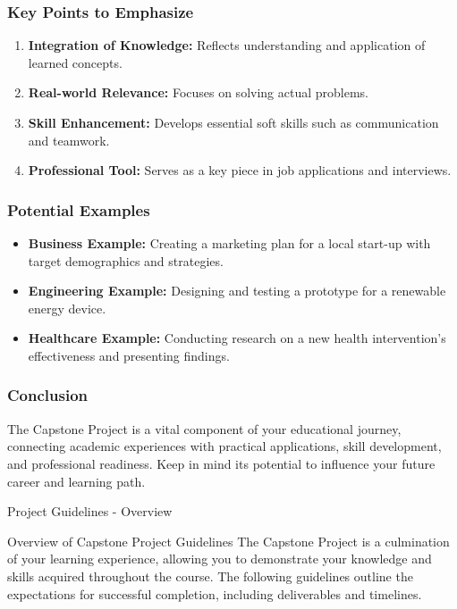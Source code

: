 \documentclass[aspectratio=169]{beamer}
\begin{document}
\begin{frame}[fragile]
    \frametitle{Key Points to Emphasize}
    \begin{enumerate}
        \item \textbf{Integration of Knowledge:} Reflects understanding and application of learned concepts.
        \item \textbf{Real-world Relevance:} Focuses on solving actual problems.
        \item \textbf{Skill Enhancement:} Develops essential soft skills such as communication and teamwork.
        \item \textbf{Professional Tool:} Serves as a key piece in job applications and interviews.
    \end{enumerate}
\end{frame}

\begin{frame}[fragile]
    \frametitle{Potential Examples}
    \begin{itemize}
        \item \textbf{Business Example:} Creating a marketing plan for a local start-up with target demographics and strategies.
        \item \textbf{Engineering Example:} Designing and testing a prototype for a renewable energy device.
        \item \textbf{Healthcare Example:} Conducting research on a new health intervention's effectiveness and presenting findings.
    \end{itemize}
\end{frame}

\begin{frame}[fragile]
    \frametitle{Conclusion}
    The Capstone Project is a vital component of your educational journey, connecting academic experiences with practical applications, skill development, and professional readiness. Keep in mind its potential to influence your future career and learning path.
\end{frame}

\begin{frame}[fragile]{Project Guidelines - Overview}
    \begin{block}{Overview of Capstone Project Guidelines}
        The Capstone Project is a culmination of your learning experience, allowing you to demonstrate your knowledge and skills acquired throughout the course. The following guidelines outline the expectations for successful completion, including deliverables and timelines.
    \end{block}
\end{frame}
\end{document}
